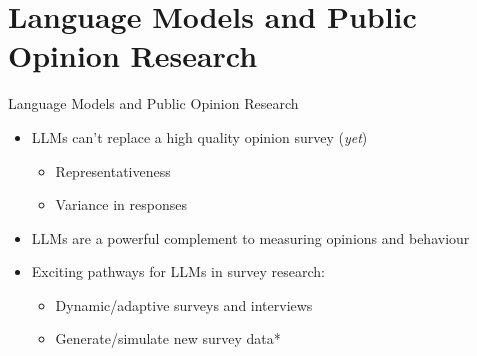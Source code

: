 \documentclass[10pt,aspectratio=169]{beamer}
\begin{document}








\section{Language Models and Public Opinion Research}

\begin{frame}{Language Models and Public Opinion Research}

\begin{itemize}
    \item LLMs can't replace a high quality opinion survey (\textit{yet})
    \begin{itemize}
        \item Representativeness 
        \item Variance in responses 
    \end{itemize}
    \item LLMs are a powerful complement to measuring opinions and behaviour 
    \item Exciting pathways for LLMs in survey research:
    \begin{itemize}
        \item Dynamic/adaptive surveys and interviews
        \item Generate/simulate new survey data* 
        \end{itemize}
\end{itemize}
\end{frame}
\end{document}
